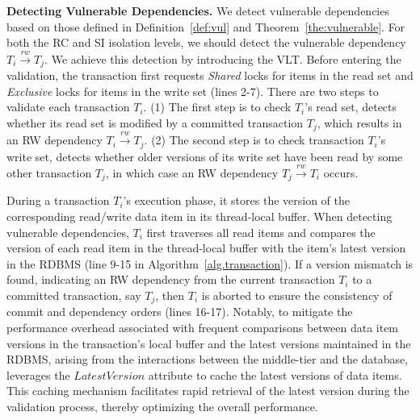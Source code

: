 \noindent\textbf{Detecting Vulnerable Dependencies.} 
We detect vulnerable dependencies based on those defined in Definition~\ref{def:vul} and Theorem~\ref{the:vulnerable}. For both the RC and SI isolation levels, we should detect the vulnerable dependency $T_i \xrightarrow{rw} T_j$. 
{
\color{blue}
We achieve this detection by introducing the VLT. 
}
Before entering the validation, the transaction first requests \textit{Shared} locks for items in the read set and \textit{Exclusive} locks for items in the write set (lines 2-7). 
There are two steps to validate each transaction $T_i$. 
(1) The first step is to check $T_i$'s read set, \sysname detects whether its read set is modified by a committed transaction $T_j$, which results in an RW dependency $T_i \xrightarrow{rw} T_j$. (2) The second step is to check transaction $T_i$'s write set, \sysname detects whether older versions of its write set have been read by some other transaction $T_j$, in which case an RW dependency $T_j \xrightarrow{rw} T_i$ occurs. 

During a transaction $T_i$'s execution phase, it stores the version of the corresponding read/write data item in its thread-local buffer. When detecting vulnerable dependencies, $T_i$ first traverses all read items and compares the version of each read item in the thread-local buffer with the item's latest version in the RDBMS (line 9-15 in Algorithm~\ref{alg.transaction}). If a version mismatch is found, indicating an RW dependency from the current transaction $T_i$ to a committed transaction, say $T_j$, then $T_i$ is aborted to 
ensure the consistency of commit and dependency orders (lines 16-17). 
{
\color{blue}
Notably, to mitigate the performance overhead associated with frequent comparisons between data item versions in the transaction's local buffer and the latest versions maintained in the RDBMS, arising from the interactions between the middle-tier and the database, \sysname leverages the $LatestVersion$ attribute to cache the latest versions of data items. This caching mechanism facilitates rapid retrieval of the latest version during the validation process, thereby optimizing the overall performance.
}

